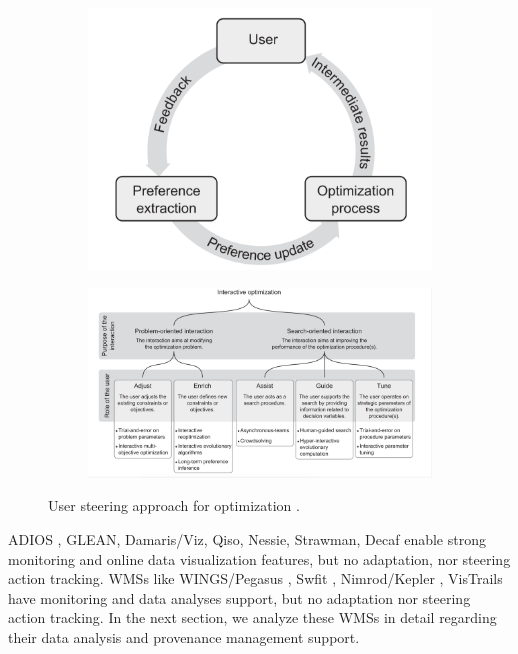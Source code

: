 \begin{figure}
\centering
\begin{subfigure}{.3\textwidth}
  \centering
  \includegraphics[width=1.0\linewidth]{img/media/image20.png}
  \label{fig:sub1}
\end{subfigure}%
\begin{subfigure}{.7\textwidth}
  \centering
  \includegraphics[width=1.0\linewidth]{img/media/image21.png}
  \label{fig:sub2}
\end{subfigure}
\caption{User steering approach for optimization
\cite{Meignan2015Review}.}
\label{fig:chap1_10}
\end{figure}


ADIOS \cite{Lofstead2008Flexible},
GLEAN, Damaris/Viz, Qiso, Nessie, Strawman, Decaf
\cite{Dreher2017Decaf:}
enable strong monitoring and online data visualization features, but no
adaptation, nor steering action tracking. WMSs like WINGS/Pegasus
\cite{Deelman2015Pegasus},
Swfit \cite{Wozniak2013Swift/T:,Duro2016Flexible},
Nimrod/Kepler \cite{Abramson2008Nimrod/K:},
VisTrails \cite{Vistrails2014VisTrails}
have monitoring and data analyses support, but no adaptation nor steering action tracking. In the next section, we analyze these WMSs in detail regarding their data analysis and provenance management support.



